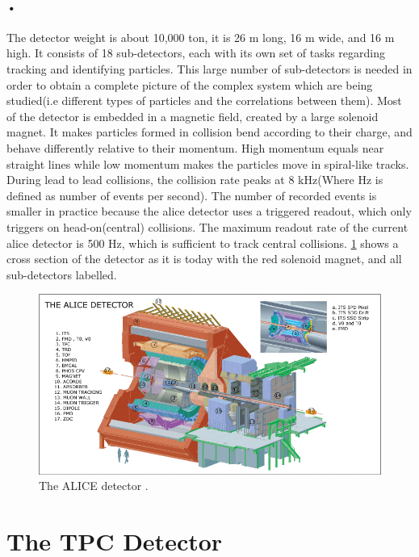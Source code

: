 \documentclass[a4paper, 12pt]{report}
\begin{document}
\paragraph{•}
The detector weight is about 10,000 ton, it is 26 m long, 16 m wide, and 16 m high\cite{alice-about}.
It consists of 18 sub-detectors, each with its own set of tasks regarding tracking and identifying particles.
This large number of sub-detectors is needed in order to obtain a complete picture of the complex system which are being studied(i.e different types of particles and the correlations between them).
Most of the detector is embedded in a magnetic field, created by a large solenoid magnet. 
It makes particles formed in collision bend according to their charge, and behave differently relative to their momentum. 
High momentum equals near straight lines while low momentum makes the particles move in spiral-like tracks.
During lead to lead collisions, the collision rate peaks at 8 kHz(Where Hz is defined as number of events per second).
The number of recorded events is smaller in practice because the \gls{alice} detector uses a triggered readout, which only triggers on head-on(central) collisions.
The maximum readout rate of the current \gls{alice} detector is 500 Hz, which is sufficient to track central collisions.
\ref{fig:alice} shows a cross section of the detector as it is today with the red solenoid magnet, and all sub-detectors labelled.

\begin{figure}[h!]
  \centering
    \includegraphics[width=1.0\textwidth]{images/alice-detector.png}
     \caption[The ALICE detector]{The ALICE detector \cite{alice-image}.}
    \label{fig:alice}
\end{figure}

\section{The TPC Detector}
\end{document}
